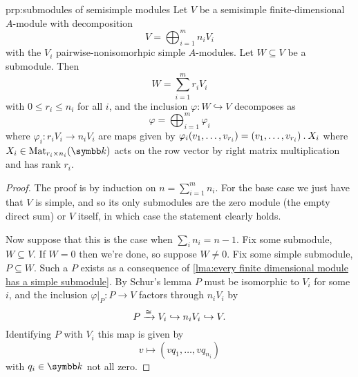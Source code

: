 \begin{prp}{}{prp:submodules of semisimple modules}
    Let \(V\) be a semisimple finite-dimensional \(A\)-module with decomposition
    \begin{equation}
        V = \bigoplus_{i=1}^m n_i V_i
    \end{equation}
    with the \(V_i\) pairwise-nonisomorhpic simple \(A\)-modules.
    Let \(W \subseteq V\) be a submodule.
    Then
    \begin{equation}
        W = \sum_{i=1}^m r_i V_i
    \end{equation}
    with \(0 \le r_i \le n_i\) for all \(i\), and the inclusion \(\varphi \colon W \hookrightarrow V\) decomposes as
    \begin{equation}
        \varphi = \bigoplus_{i=1}^m \varphi_i
    \end{equation}
    where \(\varphi_i \colon r_i V_i \to n_i V_i\) are maps given by \(\varphi_i(v_1, \dotsc, v_{r_i}) = (v_1, \dotsc, v_{r_i}) \mathbin{.} X_i\) where \(X_i \in \matrices[r_i]{n_i}{\field}\) acts on the row vector by right matrix multiplication and has rank \(r_i\).
    \begin{proof}
        The proof is by induction on \(n = \sum_{i=1}^m n_i\).
        For the base case we just have that \(V\) is simple, and so its only submodules are the zero module (the empty direct sum) or \(V\) itself, in which case the statement clearly holds.
        
        Now suppose that this is the case when \(\sum_{i} n_i = n - 1\).
        Fix some submodule, \(W \subseteq V\).
        If \(W = 0\) then we're done, so suppose \(W \ne 0\).
        Fix some simple submodule, \(P \subseteq W\).
        Such a \(P\) exists as a consequence of \cref{lma:every finite dimensional module has a simple submodule}.
        By Schur's lemma \(P\) must be isomorphic to \(V_i\) for some \(i\), and the inclusion \(\varphi|_P \colon P \to V\) factors through \(n_i V_i\) by
        \begin{equation}
            P \xrightarrow{\cong} V_i \hookrightarrow n_i V_i \hookrightarrow V.
        \end{equation}
        Identifying \(P\) with \(V_i\) this map is given by
        \begin{equation}
            v \mapsto (v q_1, \dotsc, v q_{n_i})
        \end{equation}
        with \(q_i \in \field\) not all zero.
        

\end{proof}
\end{prp}
